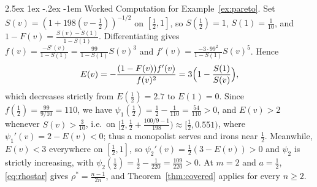 \documentclass[12pt]{article}
\makeatletter
\theoremstyle{mystyle}
\theoremstyle{mystyle2}
\newcommand{\mmpfont}{\scshape}
\renewcommand\paragraph{\@startsection{paragraph}{4}{\z@}%
                                    {2.5ex \@plus 1ex \@minus -.2ex}%
                                    {-1em}%
                                    {\normalfont\normalsize\mmpfont}}
\newcommand{\1}{\mathbf{1}}
\makeatother
\begin{document}
\paragraph{Worked Computation for Example~\ref{ex:pareto}.}
Set $S(v)=(1+198(v-\frac{1}{2}))^{-1/2}$ on $[\frac{1}{2},1]$, so $S(\frac{1}{2})=1$, $S(1)=\frac{1}{10}$, and $1-F(v)=\frac{S(v)-S(1)}{1-S(1)}$. Differentiating gives $f(v)=\frac{-S'(v)}{1-S(1)}=\frac{99}{1-S(1)}S(v)^3$ and $f'(v)=\frac{-3\cdot 99^2}{1-S(1)}S(v)^5$. Hence
\[
E(v) = -\frac{(1-F(v))f'(v)}{f(v)^2} = 3\Bigl(1 - \frac{S(1)}{S(v)}\Bigr),
\]
which decreases strictly from $E(\frac{1}{2})=2.7$ to $E(1)=0$. Since $f(\frac{1}{2})=\frac{99}{9/10}=110$, we have $\psi_1(\frac{1}{2})=\frac{1}{2}-\frac{1}{110}=\frac{54}{110}>0$, and $E(v)>2$ whenever $S(v)>\frac{3}{10}$, i.e.\ on $[\frac{1}{2},\frac{1}{2}+\frac{100/9-1}{198})\approx[\frac{1}{2},0.551)$, where $\psi_1'(v)=2-E(v)<0$; thus a monopolist serves and irons near $\frac{1}{2}$. Meanwhile, $E(v)<3$ everywhere on $[\frac{1}{2},1]$, so $\psi_2'(v)=\frac{1}{2}(3-E(v))>0$ and $\psi_2$ is strictly increasing, with $\psi_2(\frac{1}{2})=\frac{1}{2}-\frac{1}{220}=\frac{109}{220}>0$. At $m=2$ and $a=\frac{1}{2}$, \eqref{eq:rhostar} gives $\rho^*=\frac{n-1}{2n}$, and Theorem~\ref{thm:covered} applies for every $n\ge 2$.
\end{document}

